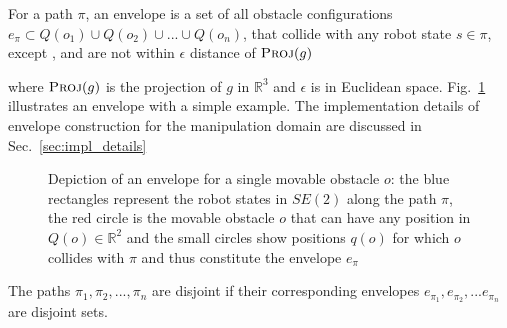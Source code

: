 \documentclass[a4paper]{report}
\begin{document}
\begin{definition}[Envelope]
\label{def:envp}
For a path $\pi$, an envelope is a set of all obstacle configurations $e_\pi \subset Q(o_1) \cup Q(o_2) \cup...\cup Q(o_n)$, that collide with any robot state $s \in \pi$, except \Sstart, and are not within $\epsilon$ distance of $\textsc{Proj}(g)$
\end{definition}

\noindent where $\textsc{Proj}(g)$ is the projection of $g$ in $\mathbb{R}^3$ and $\epsilon$ is in Euclidean space. Fig.~\ref{fig:envp} illustrates an envelope with a simple example.
The implementation details of envelope construction for the manipulation domain are discussed in Sec.~\ref{sec:impl_details}

\begin{figure}[bt]
\centering
\caption{Depiction of an envelope for a single movable obstacle $o$: the blue rectangles represent the robot states in $SE(2)$ along the path $\pi$, the red circle is the movable obstacle $o$ that can have any position in $Q(o) \in \mathbb{R}^2$ and the small circles show positions $q(o)$ for which $o$ collides with $\pi$ and thus constitute the envelope $e_\pi$}
\label{fig:envp}
\end{figure}

\begin{definition}
\label{def:disjointness}
The paths $\pi_1,\pi_2,...,\pi_n$ are disjoint if their corresponding envelopes $e_{\pi_1},e_{\pi_2},...e_{\pi_n}$ are disjoint sets.
\end{definition}
\end{document}
